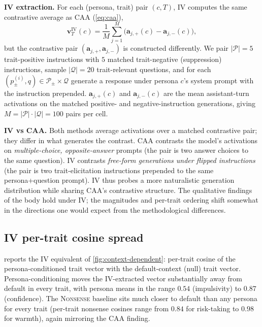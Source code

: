 \documentclass{article}
\theoremstyle{plain}
\theoremstyle{definition}
\theoremstyle{remark}
\begin{document}
\textbf{IV extraction.} For each (persona, trait) pair $(c, T)$, IV computes the same contrastive average as CAA (\cref{eq:caa}),
\begin{equation}
    \mathbf{v}^{\text{IV}}_T(c) = \frac{1}{M}\sum_{j=1}^{M} \bigl( \mathbf{a}_{j,+}(c) - \mathbf{a}_{j,-}(c) \bigr),
    \label{eq:iv}
\end{equation}
but the contrastive pair $(\mathbf{a}_{j,+}, \mathbf{a}_{j,-})$ is constructed differently. We pair $|\mathcal{P}| = 5$ trait-positive instructions with $5$ matched trait-negative (suppression) instructions, sample $|\mathcal{Q}| = 20$ trait-relevant questions, and for each $(p_\pm^{(i)}, q) \in \mathcal{P}_\pm \times \mathcal{Q}$ generate a response under persona $c$'s system prompt with the instruction prepended. $\mathbf{a}_{j,+}(c)$ and $\mathbf{a}_{j,-}(c)$ are the mean assistant-turn activations on the matched positive- and negative-instruction generations, giving $M = |\mathcal{P}| \cdot |\mathcal{Q}| = 100$ pairs per cell.

\textbf{IV vs CAA.} Both methods average activations over a matched contrastive pair; they differ in what generates the contrast. CAA contrasts the model's activations on \emph{multiple-choice, opposite-answer} prompts (the pair is two answer choices to the same question). IV contrasts \emph{free-form generations under flipped instructions} (the pair is two trait-elicitation instructions prepended to the same persona+question prompt). IV thus probes a more naturalistic generation distribution while sharing CAA's contrastive structure. The qualitative findings of the body hold under IV; the magnitudes and per-trait ordering shift somewhat in the directions one would expect from the methodological differences.

\subsection{IV per-trait cosine spread}
\label{app:iv-spread}

 reports the IV equivalent of \cref{fig:context-dependent}: per-trait cosine of the persona-conditioned trait vector with the default-context (null) trait vector. Persona-conditioning moves the IV-extracted vector substantially away from default in every trait, with persona means in the range $0.54$ (impulsivity) to $0.87$ (confidence). The \textsc{Nonsense} baseline sits much closer to default than any persona for every trait (per-trait nonsense cosines range from $0.84$ for risk-taking to $0.98$ for warmth), again mirroring the CAA finding.
\end{document}
